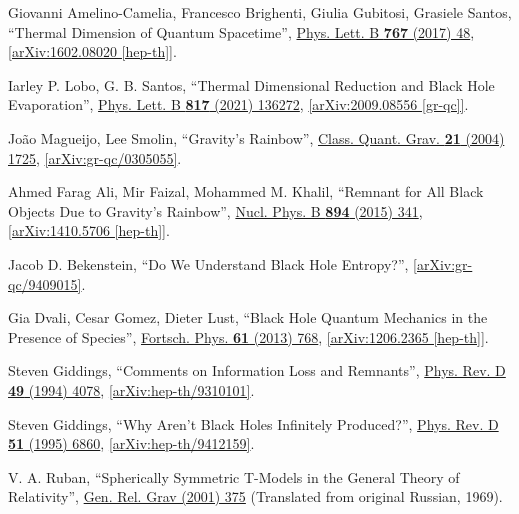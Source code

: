 \documentclass[12pt,preprintnumbers, floatfix, preprintnumbers, letterpaper, superscriptaddress,nofootinbib]{revtex4-2}
\begin{document}
\begin{thebibliography}{99}
Giovanni Amelino-Camelia, Francesco Brighenti, Giulia Gubitosi, Grasiele Santos, ``Thermal Dimension of Quantum Spacetime'',  {\href{https://www.sciencedirect.com/science/article/pii/S0370269317300680?via\%3Dihub}{Phys. Lett. B \textbf{767} (2017) 48}}, \href{https://arxiv.org/abs/1602.08020}{[arXiv:1602.08020 [hep-th]]}.

Iarley  P. Lobo, G. B. Santos, ``Thermal Dimensional Reduction and Black Hole Evaporation'', {\href{https://linkinghub.elsevier.com/retrieve/pii/S0370269321002124}{Phys. Lett. B \textbf{817} (2021) 136272}}, \href{https://arxiv.org/abs/2009.08556}{[arXiv:2009.08556 [gr-qc]]}.

Jo\~{a}o Magueijo, Lee Smolin, ``Gravity's Rainbow'', {\href{https://iopscience.iop.org/article/10.1088/0264-9381/21/7/001}{Class. Quant. Grav. \textbf{21} (2004) 1725}}, \href{https://arxiv.org/abs/gr-qc/0305055}{[arXiv:gr-qc/0305055]}.

Ahmed Farag Ali, Mir Faizal, Mohammed M. Khalil, ``Remnant for All Black Objects Due to Gravity's Rainbow'', {\href{https://www.sciencedirect.com/science/article/pii/S0550321315000966?via\%3Dihub}{Nucl. Phys. B \textbf{894} (2015) 341}}, \href{https://arxiv.org/abs/1410.5706}{[arXiv:1410.5706 [hep-th]]}.


Jacob D. Bekenstein, ``Do We Understand Black Hole Entropy?'', \href{https://arxiv.org/abs/gr-qc/9409015}{[arXiv:gr-qc/9409015]}.

Gia Dvali, Cesar Gomez, Dieter Lust, ``Black Hole Quantum Mechanics in the Presence of Species'', {\href{https://onlinelibrary.wiley.com/doi/10.1002/prop.201300002}{Fortsch. Phys. \textbf{61} (2013) 768}}, \href{https://arxiv.org/abs/1206.2365}{[arXiv:1206.2365 [hep-th]]}.

Steven Giddings, ``Comments on Information Loss and Remnants'', {\href{https://journals.aps.org/prd/abstract/10.1103/PhysRevD.49.4078}{Phys. Rev. D \textbf{49} (1994) 4078}}, \href{https://arxiv.org/abs/hep-th/9310101}{[arXiv:hep-th/9310101]}.

Steven Giddings, ``Why Aren't Black Holes Infinitely Produced?'', {\href{https://journals.aps.org/prd/abstract/10.1103/PhysRevD.51.6860}{Phys. Rev. D \textbf{51} (1995) 6860}}, \href{https://arxiv.org/abs/hep-th/9412159}{[arXiv:hep-th/9412159]}.

V. A. Ruban, ``Spherically Symmetric T-Models in the General Theory of Relativity'', {\href{https://link.springer.com/article/10.1023/A:1002779702615}{Gen. Rel. Grav  (2001) 375}} (Translated from original Russian, 1969).


\end{thebibliography}
\end{document}
